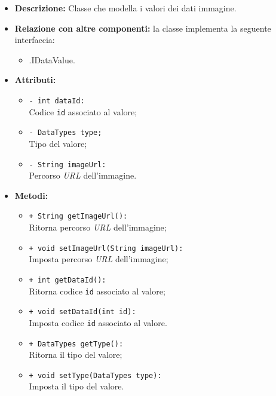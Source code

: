 \begin{flushleft}
\begin{itemize}
\item \textbf{Descrizione:} Classe che modella i valori dei dati immagine.
\item \textbf{Relazione con altre componenti:} la classe implementa la seguente interfaccia:
		\begin{itemize}
			\item \smodel{}.IDataValue.
		\end{itemize}
\item \textbf{Attributi:}
\begin{sloppypar}
\begin{itemize}
\item \texttt{- int dataId:}\\ Codice \texttt{id} associato al valore;
\item \texttt{- DataTypes type;}\\ Tipo del valore;
\item \texttt{- String imageUrl:}\\ Percorso \textit{URL} dell'immagine.
\end{itemize}
\end{sloppypar}
\item \textbf{Metodi:}
\begin{sloppypar}
\begin{itemize}
\item \texttt{+ String getImageUrl():}\\ Ritorna percorso \textit{URL} dell'immagine;
\item \texttt{+ void setImageUrl(String imageUrl):}\\ Imposta percorso \textit{URL} dell'immagine;
\item \texttt{+ int getDataId():}\\ Ritorna codice \texttt{id} associato al valore;
\item \texttt{+ void setDataId(int id):}\\ Imposta codice \texttt{id} associato al valore.
\item \texttt{+ DataTypes getType():}\\ Ritorna il tipo del valore;
\item \texttt{+ void setType(DataTypes type):}\\ Imposta il tipo del valore.
\end{itemize}
\end{sloppypar}
\end{itemize}
\end{flushleft}

